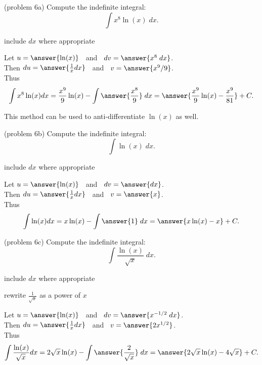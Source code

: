 \documentclass[handout]{ximera}
\begin{document}
\begin{problem}(problem 6a)
  Compute the indefinite integral:
  \[
  \int x^8 \ln(x) \;dx.
  \]
  
  \begin{hint}
      include $dx$ where appropriate
  \end{hint}
  Let $u = \answer{\ln(x)}\;\;$   and   $\;\;dv = \answer{x^8 \;dx}$.\\
  Then $du = \answer{\frac{1}{x} dx}\;\;$   and   $\;\;v = \answer{x^9/9}$.\\
  Thus 
  \[
  \int x^8 \ln(x) dx = \frac{x^9}{9}\ln(x) - \int \answer{\frac{x^8}{9}} \;dx = \answer{\frac{x^9}{9}\ln(x) -\frac{x^9}{81}} + C.
  \]

\end{problem}

This method can be used to anti-differentiate $\ln(x)$ as well.


\begin{problem}(problem 6b) 
  Compute the indefinite integral:
  \[
  \int \ln(x) \;dx.
  \]
  
  \begin{hint}
      include $dx$ where appropriate
  \end{hint}
  Let $u = \answer{\ln(x)}\;\;$   and   $\;\;dv = \answer{dx}$.\\
  Then $du = \answer{\frac{1}{x} dx}\;\;$   and   $\;\;v = \answer{x}$.\\
  Thus 
  \[
  \int  \ln(x) dx = x\ln(x) - \int \answer{1} \;dx = \answer{x\ln(x) -x} + C.
  \]

\end{problem}

\begin{problem}(problem 6c)
  Compute the indefinite integral:
  \[
  \int \frac{\ln(x)}{\sqrt x} \;dx.
  \]
  
  \begin{hint}
      include $dx$ where appropriate
  \end{hint}
  \begin{hint}
      rewrite $\frac{1}{\!\sqrt x}$ as a power of $x$
  \end{hint}
  Let $u = \answer{\ln(x)}\;\;$   and   $\;\;dv = \answer{x^{-1/2} \;dx}$.\\
  Then $du = \answer{\frac{1}{x} dx}\;\;$   and   $\;\;v = \answer{2x^{1/2}}$.\\
  Thus 
  \[
  \int \frac{\ln(x)}{\!\sqrt x} dx = 2\sqrt x \ln(x) - \int \answer{\frac{2}{\sqrt x}} \;dx = \answer{2\sqrt x \ln(x) -4\sqrt x} + C.
  \]

\end{problem}
\end{document}
